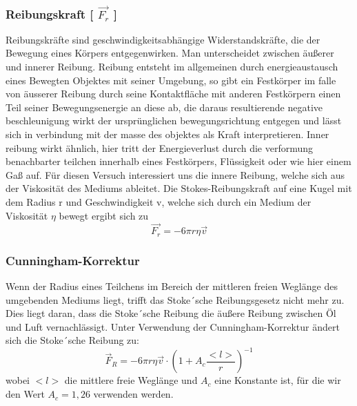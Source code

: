 \documentclass{scrartcl}
\begin{document}
			\subsubsection{Reibungskraft [ $\vec{F_r}$ ]}
			Reibungskräfte sind geschwindigkeitsabhängige Widerstandskräfte, die der Bewegung eines Körpers entgegenwirken.
			Man unterscheidet zwischen äußerer und innerer Reibung.
			Reibung entsteht im allgemeinen durch energieaustausch eines Bewegten Objektes mit seiner Umgebung,
			so gibt ein Festkörper im falle von äusserer Reibung durch seine Kontaktfläche mit anderen Festkörpern
			einen Teil seiner Bewegungsenergie an diese ab, die daraus resultierende negative beschleunigung wirkt
			der ursprünglichen bewegungsrichtung entgegen und lässt sich in verbindung mit der masse des objektes als
			Kraft interpretieren. Inner reibung wirkt ähnlich, hier tritt der Energieverlust durch die verformung
			benachbarter teilchen innerhalb eines Festkörpers, Flüssigkeit oder wie hier einem Gaß auf.
			Für diesen Versuch interessiert uns die innere Reibung, welche sich aus der Viskosität des Mediums ableitet.
			Die Stokes-Reibungskraft auf eine Kugel mit dem Radius r und Geschwindigkeit v, welche sich durch ein Medium der Viskosität $\eta$ bewegt ergibt sich zu
			\begin{equation}
				\vec{F_r} = -6 \pi r \eta \vec{v}
			\end{equation}
		\subsubsection{Cunningham-Korrektur}
			Wenn der Radius eines Teilchens im Bereich der mittleren freien Weglänge des umgebenden Mediums liegt, trifft das Stoke´sche Reibungsgesetz nicht mehr zu.
			Dies liegt daran, dass die Stoke´sche Reibung die äußere Reibung zwischen Öl und Luft vernachlässigt.
			Unter Verwendung der Cunningham-Korrektur ändert sich die Stoke´sche Reibung zu:
			\begin{equation}
				\vec{F}_R = -6 \pi r \eta \vec{v} \cdot (1 + A_c \frac{<l>}{r})^{-1}
			\end{equation}
			wobei $<l>$ die mittlere freie Weglänge und $A_c$ eine Konstante ist, für die wir den Wert $A_c = 1,26$ verwenden werden.
\end{document}
